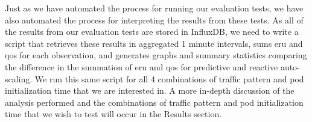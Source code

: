 Just as we have automated the process for running our evaluation tests, we have
also automated the process for interpreting the results from these tests. As all
of the results from our evaluation tests are stored in InfluxDB, we need to
write a script that retrieves these results in aggregated 1 minute intervals,
sums eru and qos for each observation, and generates graphs and summary
statistics comparing the difference in the summation of eru and qos for
predictive and reactive auto-scaling. We run this same script for all 4
combinations of traffic pattern and pod initialization time that we are
interested in. A more in-depth discussion of the analysis performed and the
combinations of traffic pattern and pod initialization time that we wish to test
will occur in the Results section.
